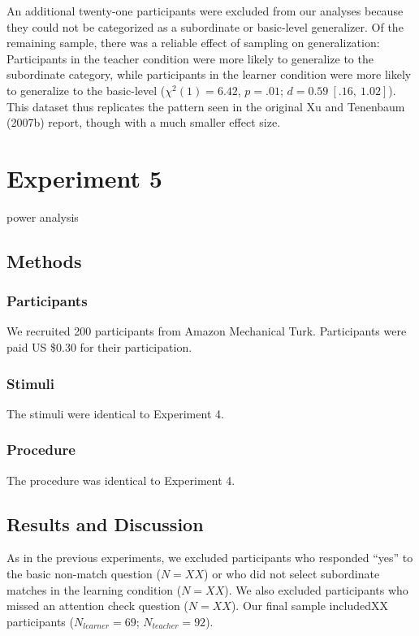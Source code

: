 \documentclass[man]{apa2}
\begin{document}
An additional twenty-one participants were excluded from our analyses because they could not be categorized as a subordinate or basic-level generalizer. Of the remaining sample, there was a reliable effect of sampling on generalization: Participants in the teacher condition were more likely to generalize to the subordinate category, while participants in the learner condition were more likely to generalize to the basic-level ($\chi^2(1) = 6.42$, $p = .01$; $d = 0.59\ [.16,\ 1.02]$). This dataset thus replicates the pattern seen in the original Xu and Tenenbaum (2007b) report, though with a much smaller effect size.

\section{Experiment 5}
power analysis
\subsection{Methods}

\subsubsection{Participants}  We recruited 200 participants from Amazon Mechanical Turk. Participants were paid US \$0.30 for their participation.

\subsubsection{Stimuli}
The stimuli were identical to Experiment 4.

\subsubsection{Procedure}
The procedure was identical to Experiment 4.

\subsection{Results and Discussion}

As in the previous experiments, we excluded participants who responded ``yes'' to the basic non-match question ($N=XX$) or who did not select subordinate matches in the learning condition ($N = XX$). We also excluded participants who missed an attention check question ($N = XX$). Our final sample includedXX participants ($N_{learner} = 69$; $N_{teacher} = 92$).
\end{document}
